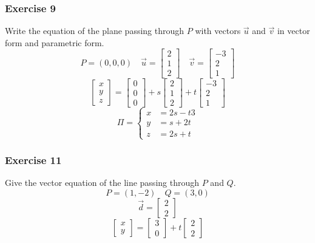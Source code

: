 \documentclass{math}
\begin{document}
\subsubsection*{Exercise 9}
Write the equation of the plane passing through \( P \) with vectors \( \vec{u}
\) and \( \vec{v} \) in vector form and parametric form.
\[ P = (0,0,0) \quad \vec{u} = \begin{bmatrix}2 \\ 1 \\ 2\end{bmatrix} \quad
  \vec{v} = \begin{bmatrix}-3 \\ 2 \\ 1\end{bmatrix} \]
\[ \begin{bmatrix}x \\ y \\ z\end{bmatrix} =
  \begin{bmatrix}0 \\ 0 \\ 0\end{bmatrix}+
  s\begin{bmatrix}2 \\ 1 \\ 2\end{bmatrix}+
  t\begin{bmatrix}-3 \\ 2 \\ 1\end{bmatrix} \]
\[ \Pi = \begin{cases}
  x &= 2s-t3 \\
  y &= s+2t \\
  z &= 2s+t
\end{cases} \]

\subsubsection*{Exercise 11}
Give the vector equation of the line passing through \( P \) and \( Q \).
\[ P = (1,-2) \quad Q = (3,0) \]
\[ \vec{d} = \begin{bmatrix}2 \\ 2\end{bmatrix} \]
\[ \begin{bmatrix}x \\ y\end{bmatrix} = \begin{bmatrix}3 \\ 0\end{bmatrix}+
  t\begin{bmatrix}2 \\ 2\end{bmatrix} \]
\end{document}
